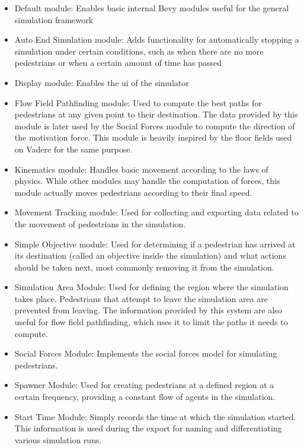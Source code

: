 \documentclass[twoside, 11pt]{article}
\begin{document}
\begin{itemize}
  \item Default module: Enables basic internal Bevy modules useful for the general simulation framework
  \item Auto End Simulation module: Adds functionality for automatically stopping a simulation under certain conditions, such as when there are no more pedestrians or when a certain amount of time has passed
  \item Display module: Enables the \gls{ui} of the simulator
  \item Flow Field Pathfinding module: Used to compute the best paths for pedestrians at any given point to their destination. The data provided by this module is later used by the Social Forces module to compute the direction of the motivation force. This module is heavily inspired by the floor fields used on Vadere for the same purpose.
  \item Kinematics module: Handles basic movement according to the laws of physics. While other modules may handle the computation of forces, this module actually moves pedestrians according to their final speed.
  \item Movement Tracking module: Used for collecting and exporting data related to the movement of pedestrians in the simulation.
  \item Simple Objective module: Used for determining if a pedestrian has arrived at its destination (called an objective inside the simulation) and what actions should be taken next, most commonly removing it from the simulation.
  \item Simulation Area Module: Used for defining the region where the simulation takes place. Pedestrians that attempt to leave the simulation area are prevented from leaving. The information provided by this system are also useful for flow field pathfinding, which uses it to limit the paths it needs to compute.
  \item Social Forces Module: Implements the social forces model for simulating pedestrians.
  \item Spawner Module: Used for creating pedestrians at a defined region at a certain frequency, providing a constant flow of agents in the simulation.
  \item Start Time Module: Simply records the time at which the simulation started. This information is used during the export for naming and differentiating various simulation runs.
\end{itemize}
\end{document}
